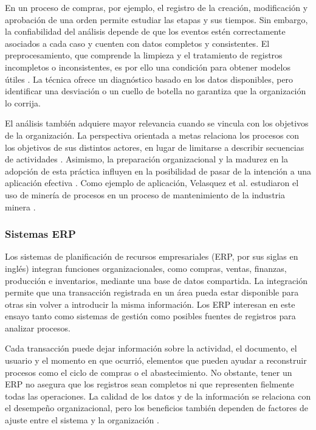 \documentclass{article}
\begin{document}
    En un proceso de compras, por ejemplo, el registro de la creación, modificación y aprobación de una orden permite estudiar las etapas y sus tiempos. Sin embargo, la confiabilidad del análisis depende de que los eventos estén correctamente asociados a cada caso y cuenten con datos completos y consistentes. El preprocesamiento, que comprende la limpieza y el tratamiento de registros incompletos o inconsistentes, es por ello una condición para obtener modelos útiles \cite{marin-castro2021preprocessing}. La técnica ofrece un diagnóstico basado en los datos disponibles, pero identificar una desviación o un cuello de botella no garantiza que la organización lo corrija.

    El análisis también adquiere mayor relevancia cuando se vincula con los objetivos de la organización. La perspectiva orientada a metas relaciona los procesos con los objetivos de sus distintos actores, en lugar de limitarse a describir secuencias de actividades \cite{ghasemi2020eventlogs}. Asimismo, la preparación organizacional y la madurez en la adopción de esta práctica influyen en la posibilidad de pasar de la intención a una aplicación efectiva \cite{processminingmaturity2024}. Como ejemplo de aplicación, Velasquez et al. estudiaron el uso de minería de procesos en un proceso de mantenimiento de la industria minera \cite{miningindustry2023}.

    \subsubsection{Sistemas ERP}

    Los sistemas de planificación de recursos empresariales (ERP, por sus siglas en inglés) integran funciones organizacionales, como compras, ventas, finanzas, producción e inventarios, mediante una base de datos compartida. La integración permite que una transacción registrada en un área pueda estar disponible para otras sin volver a introducir la misma información. Los ERP interesan en este ensayo tanto como sistemas de gestión como posibles fuentes de registros para analizar procesos.

    Cada transacción puede dejar información sobre la actividad, el documento, el usuario y el momento en que ocurrió, elementos que pueden ayudar a reconstruir procesos como el ciclo de compras o el abastecimiento. No obstante, tener un ERP no asegura que los registros sean completos ni que representen fielmente todas las operaciones. La calidad de los datos y de la información se relaciona con el desempeño organizacional, pero los beneficios también dependen de factores de ajuste entre el sistema y la organización \cite{erpimpact2024}.
\end{document}
